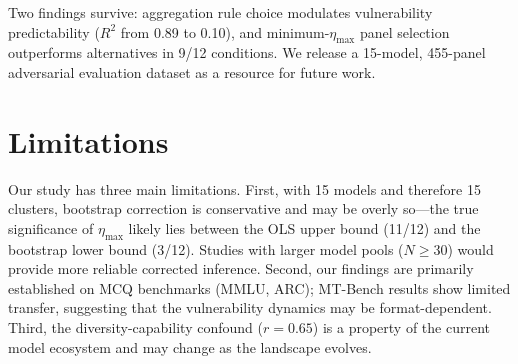 \documentclass[11pt]{article}
\begin{document}
Two findings survive: aggregation rule choice modulates vulnerability predictability ($R^2$ from 0.89 to 0.10), and minimum-$\eta_{\max}$ panel selection outperforms alternatives in 9/12 conditions. We release a 15-model, 455-panel adversarial evaluation dataset as a resource for future work.


\section*{Limitations}

Our study has three main limitations. First, with 15 models and therefore 15 clusters, bootstrap correction is conservative and may be overly so---the true significance of $\eta_{\max}$ likely lies between the OLS upper bound (11/12) and the bootstrap lower bound (3/12). Studies with larger model pools ($N \geq 30$) would provide more reliable corrected inference. Second, our findings are primarily established on MCQ benchmarks (MMLU, ARC); MT-Bench results show limited transfer, suggesting that the vulnerability dynamics may be format-dependent. Third, the diversity-capability confound ($r = 0.65$) is a property of the current model ecosystem and may change as the landscape evolves.




\end{document}
